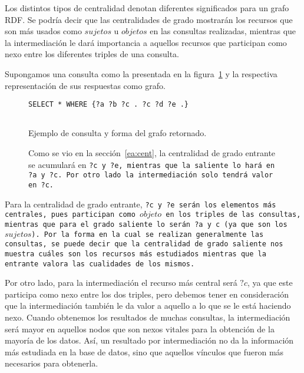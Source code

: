 Los distintos tipos de centralidad denotan diferentes significados para un grafo
RDF.
Se podría decir que las centralidades de grado mostrarán los recursos que son
más usados como $sujetos$ u $objetos$ en las consultas realizadas, mientras que
la intermediación le dará importancia a aquellos recursos que participan como
nexo entre los diferentes triples de una consulta.

Supongamos una consulta como la presentada en la figura~\ref{fig:excen} y la
respectiva representación de sus respuestas como grafo.

\begin{figure}[h!]
  \centering
  \tt{SELECT * WHERE \{?a ?b ?c . ?c ?d ?e .\}}
  \\\tt{~}\\
  \caption{Ejemplo de consulta y forma del grafo retornado.}
  \label{fig:excen}
  \vspace{-.2cm}
  \caption*{\small
    Como se vio en la sección~\ref{ea:cent}, la centralidad de grado entrante se
    acumulará en \tt{?c} y \tt{?e}, mientras que la saliente lo hará en \tt{?a}
    y \tt{?c}. Por otro lado la intermediación solo tendrá valor en \tt{?c}.
  }
\end{figure}

Para la centralidad de grado entrante, \tt{?c} y \tt{?e} serán los elementos más
centrales, pues participan como $objeto$ en los triples de las consultas,
mientras que para el grado saliente lo serán \tt{?a} y \tt{c} (ya que son
los $sujetos$).
Por la forma en la cual se realizan generalmente las consultas, se puede decir
que la centralidad de grado saliente nos muestra cuáles son los recursos más
estudiados mientras que la entrante valora las cualidades de los mismos.

Por otro lado, para la intermediación el recurso más central será $?c$, ya que
este participa como nexo entre los dos triples, pero debemos tener en
consideración que la intermediación también le da valor a aquello a lo que se le
está haciendo nexo.
Cuando obtenemos los resultados de muchas consultas, la intermediación será
mayor en aquellos nodos que son nexos vitales para la obtención de la mayoría de
los datos.
Así, un resultado por intermediación no da la información más estudiada en la
base de datos, sino que aquellos vínculos que fueron más necesarios para
obtenerla.

